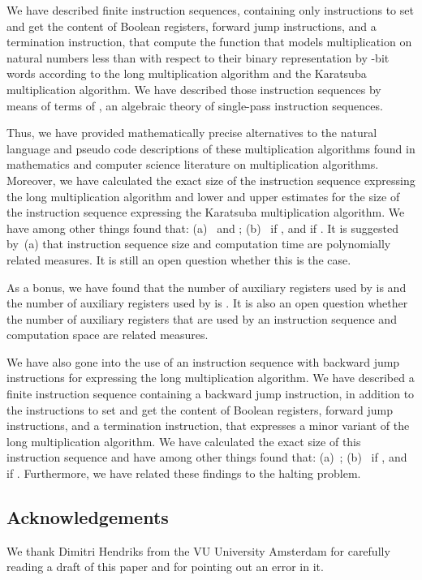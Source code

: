 \documentclass{llncs}
\begin{document}
We have described finite instruction sequences, containing only 
instructions to set and get the content of Boolean registers, forward 
jump instructions, and a termination instruction, that compute the 
function that models multiplication on natural numbers less than 
 with respect to their binary representation by -bit words
according to the long multiplication algorithm and the Karatsuba 
multiplication algorithm.
We have described those instruction sequences by means of terms of \PGA,
an algebraic theory of single-pass instruction sequences.

Thus, we have provided mathematically precise alternatives to the
natural language and pseudo code descriptions of these multiplication 
algorithms found in mathematics and computer science literature on 
multiplication algorithms.
Moreover, we have calculated the exact size of the instruction sequence 
 expressing the long multiplication algorithm and lower and 
upper estimates for the size of the instruction sequence  
expressing the Karatsuba multiplication algorithm.
We have among other things found that: 
(a)~ and
    ; 
(b)~ if , and
     if .
It is suggested by~(a) that instruction sequence size and computation 
time are polynomially related measures.
It is still an open question whether this is the case.

As a bonus, we have found that the number of auxiliary registers used by 
 is  and the number of auxiliary registers 
used by  is 
.
It is also an open question whether the number of auxiliary registers 
that are used by an instruction sequence and computation space are 
related measures.

We have also gone into the use of an instruction sequence with backward 
jump instructions for expressing the long multiplication algorithm.
We have described a finite instruction sequence  containing 
a backward jump instruction, in addition to the instructions to set and 
get the content of Boolean registers, forward jump instructions, and a 
termination instruction, that expresses a minor variant of the long 
multiplication algorithm.
We have calculated the exact size of this instruction sequence and have 
among other things found that:
(a)~;
(b)~ if , and 
     if .
Furthermore, we have related these findings to the halting problem.

\subsection*{Acknowledgements}
We thank Dimitri Hendriks from the VU University Amsterdam for carefully
reading a draft of this paper and for pointing out an error in it.



\end{document}
